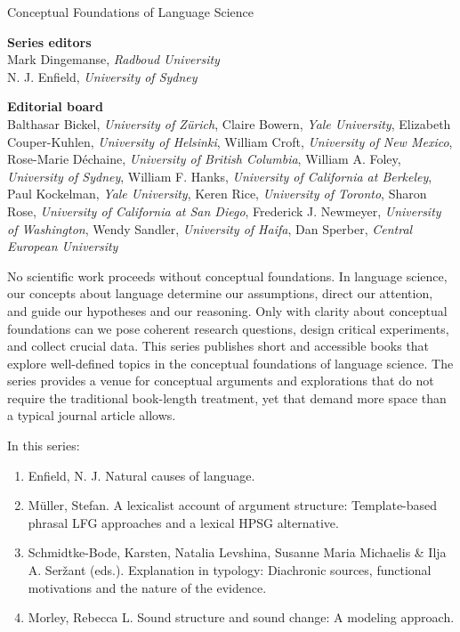 {\large Conceptual Foundations of Language Science}

\bigskip

\textbf{Series editors}\\
Mark Dingemanse, \textit{Radboud University}\\
N. J. Enfield, \textit{University of Sydney}


\bigskip


\textbf{Editorial board}\\
Balthasar Bickel, \textit{University of Zürich},
Claire Bowern, \textit{Yale University},
Elizabeth Couper-Kuhlen, \textit{University of Helsinki},
William Croft, \textit{University of New Mexico},
Rose-Marie Déchaine, \textit{University of British Columbia},
William A. Foley, \textit{University of Sydney},
William F. Hanks, \textit{University of California at Berkeley},
Paul Kockelman, \textit{Yale University},
Keren Rice, \textit{University of Toronto},
Sharon Rose, \textit{University of California at San Diego},
Frederick J. Newmeyer, \textit{University of Washington},
Wendy Sandler, \textit{University of Haifa},
Dan Sperber, \textit{Central European University}

 
\bigskip

\begin{minipage}{\textwidth}%

No scientific work proceeds without conceptual foundations. In language science, our concepts about language determine our assumptions, direct our attention, and guide our hypotheses and our reasoning. Only with clarity about conceptual foundations can we pose coherent research questions, design critical experiments, and collect crucial data.
%
This series publishes short and accessible books that explore well-defined topics in the conceptual foundations of language science. The series provides a venue for conceptual arguments and explorations that do not require the traditional book-length treatment, yet that demand more space than a typical journal article allows.
\end{minipage}

\bigskip
\bigskip

In this series:

\begin{enumerate}
\item Enfield, N. J. {Natural causes of language}.
\item Müller, Stefan. {A lexicalist account of argument structure: Template-based phrasal LFG approaches and a lexical HPSG alternative}.
\item Schmidtke-Bode, Karsten,  Natalia Levshina, Susanne Maria Michaelis \& Ilja A. Seržant (eds.).  Explanation in typology: Diachronic sources, functional motivations and the nature of the evidence.
\item Morley, Rebecca L. Sound structure and sound change: A modeling approach.
\end{enumerate}
